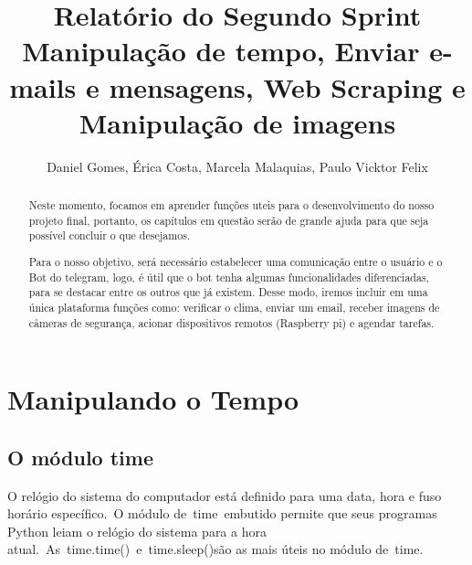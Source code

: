 \documentclass[12pt, a4paper, twocolumn]{article}
\title{Relatório do Segundo Sprint\\ \textbf{Manipulação de tempo, Enviar e-mails e mensagens, Web Scraping e Manipulação de imagens}
		}
\author{Daniel Gomes, Érica Costa, Marcela Malaquias, Paulo Vicktor Felix}
\begin{document}
\maketitle

\begin{abstract}
Neste momento, focamos em aprender funções uteis para o desenvolvimento do nosso projeto final, portanto, os capítulos em questão serão de grande ajuda para que seja possível concluir o que desejamos.

Para o nosso objetivo, será necessário estabelecer uma comunicação entre o usuário e o Bot do telegram, logo, é útil que o bot tenha algumas funcionalidades diferenciadas, para se destacar entre os outros que já existem. Desse modo, iremos incluir em uma única plataforma funções como: verificar o clima, enviar um email, receber imagens de câmeras de segurança, acionar dispositivos remotos (Raspberry pi) e agendar tarefas.

\end{abstract}
\section{Manipulando o Tempo}
\subsection{O módulo time}
O relógio do sistema do computador está definido para uma data, hora e fuso horário específico. O módulo de time embutido permite que seus programas Python leiam o relógio do sistema para a hora atual. As time.time() e time.sleep()são as mais úteis no módulo de time.
\end{document}
